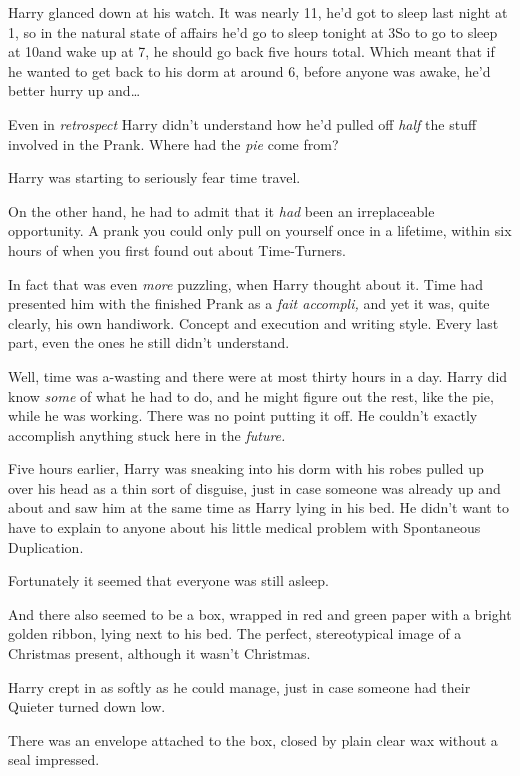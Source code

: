 Harry glanced down at his watch. It was nearly 11\am, he’d got to sleep last night at 1\am, so in the natural state of affairs he’d go to sleep tonight at 3\am So to go to sleep at 10\pm and wake up at 7\am, he should go back five hours total. Which meant that if he wanted to get back to his dorm at around 6\am, before anyone was awake, he’d better hurry up and…

Even in \emph{retrospect} Harry didn’t understand how he’d pulled off \emph{half} the stuff involved in the Prank. Where had the \emph{pie} come from?

Harry was starting to seriously fear time travel.

On the other hand, he had to admit that it \emph{had} been an irreplaceable opportunity. A prank you could only pull on yourself once in a lifetime, within six hours of when you first found out about Time-Turners.

In fact that was even \emph{more} puzzling, when Harry thought about it. Time had presented him with the finished Prank as a \emph{fait accompli,} and yet it was, quite clearly, his own handiwork. Concept and execution and writing style. Every last part, even the ones he still didn’t understand.

Well, time was a-wasting and there were at most thirty hours in a day. Harry did know \emph{some} of what he had to do, and he might figure out the rest, like the pie, while he was working. There was no point putting it off. He couldn’t exactly accomplish anything stuck here in the \emph{future.}

\later

Five hours earlier, Harry was sneaking into his dorm with his robes pulled up over his head as a thin sort of disguise, just in case someone was already up and about and saw him at the same time as Harry lying in his bed. He didn’t want to have to explain to anyone about his little medical problem with Spontaneous Duplication.

Fortunately it seemed that everyone was still asleep.

And there also seemed to be a box, wrapped in red and green paper with a bright golden ribbon, lying next to his bed. The perfect, stereotypical image of a Christmas present, although it wasn’t Christmas.

Harry crept in as softly as he could manage, just in case someone had their Quieter turned down low.

There was an envelope attached to the box, closed by plain clear wax without a seal impressed.


